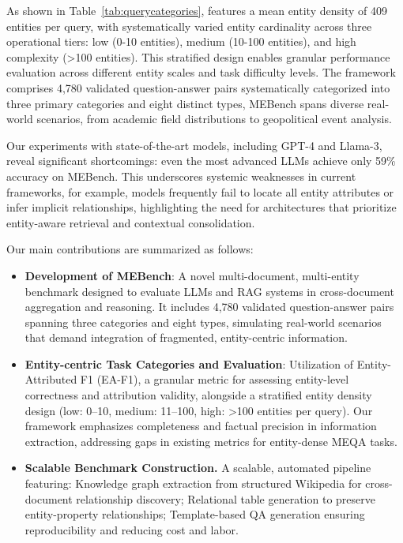 As shown in Table~\ref{tab:querycategories}, \ben features a mean entity density of 409 entities per query, with systematically varied entity cardinality across three operational tiers: low (0-10 entities), medium (10-100 entities), and high complexity (>100 entities). This stratified design enables granular performance evaluation across different entity scales and task difficulty levels. The framework comprises 4,780 validated question-answer pairs systematically categorized into three primary categories and eight distinct types, MEBench spans diverse real-world scenarios, from academic field distributions to geopolitical event analysis.

Our experiments with state-of-the-art models, including GPT-4 and Llama-3, reveal significant shortcomings: even the most advanced LLMs achieve only 59\% accuracy on MEBench. This underscores systemic weaknesses in current frameworks, for example, models frequently fail to locate all entity attributes or infer implicit relationships, highlighting the need for architectures that prioritize entity-aware retrieval and contextual consolidation.

Our main contributions are summarized as follows:  


\begin{itemize}
\item {\textbf{Development of MEBench}}: A novel multi-document, multi-entity benchmark designed to evaluate LLMs and RAG systems in cross-document aggregation and reasoning. It includes 4,780 validated question-answer pairs spanning three categories and eight types, simulating real-world scenarios that demand integration of fragmented, entity-centric information.   
\item {\textbf{Entity-centric Task Categories and Evaluation}}: Utilization of Entity-Attributed F1 (EA-F1), a granular metric for assessing entity-level correctness and attribution validity, alongside a stratified entity density design (low: 0–10, medium: 11–100, high: >100 entities per query). Our framework emphasizes completeness and factual precision in information extraction, addressing gaps in existing metrics for entity-dense MEQA tasks.
\item {\textbf{Scalable Benchmark Construction.}} A scalable, automated pipeline featuring: Knowledge graph extraction from structured Wikipedia for cross-document relationship discovery; Relational table generation to preserve entity-property relationships; Template-based QA generation ensuring reproducibility and reducing cost and labor.
\end{itemize}

